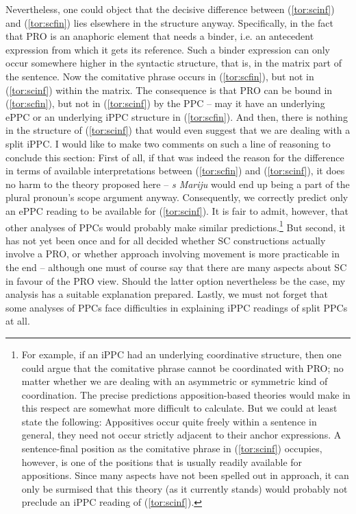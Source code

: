 \documentclass[output=paper,colorlinks,citecolor=brown]{langscibook}
\begin{document}
Nevertheless, one could object that the decisive difference between (\ref{tor:scinf}) and (\ref{tor:scfin}) lies elsewhere in the structure anyway. Specifically, in the fact that PRO is an anaphoric element that needs a binder, i.e. an antecedent expression from which it gets its reference. Such a binder expression can only occur somewhere higher in the syntactic structure, that is, in the matrix part of the sentence. Now the comitative phrase occurs in (\ref{tor:scfin}), but not in (\ref{tor:scinf}) within the matrix. The consequence is that PRO can be bound in (\ref{tor:scfin}), but not in (\ref{tor:scinf}) by the PPC -- may it have an underlying ePPC  or an underlying iPPC structure in (\ref{tor:scfin}). And then, there is nothing in the structure of (\ref{tor:scinf}) that would even suggest that we are dealing with a split iPPC. I would like to make two comments on such a line of reasoning to conclude this section: First of all, if that was indeed the reason for the difference in terms of available interpretations between (\ref{tor:scfin}) and (\ref{tor:scinf}), it does no harm to the theory proposed here -- \textit{s Mariju} would end up being a part of the plural pronoun's scope argument anyway. Consequently, we correctly predict only an ePPC reading to be available for (\ref{tor:scinf}). It is fair to admit, however, that other analyses of PPCs would probably make similar predictions.\footnote{For example, if an iPPC had an underlying coordinative structure, then one could argue that the comitative phrase cannot be coordinated with PRO; no matter whether we are dealing with an asymmetric or symmetric kind of coordination. The precise predictions apposition-based theories would make in this respect are somewhat more difficult to calculate. But we could at least state the following: Appositives occur quite freely within a sentence in general, they need not occur strictly adjacent to their anchor expressions. A sentence-final position as the comitative phrase in (\ref{tor:scinf}) occupies, however, is one of the positions that is usually readily available for appositions. Since many aspects have not been spelled out in  approach, it can only be surmised that this theory (as it currently stands) would probably not preclude an iPPC reading of (\ref{tor:scinf}).} But second, it has not yet been once and for all decided whether SC constructions actually involve a PRO, or whether  approach involving movement is more practicable in the end -- although one must of course say that there are many aspects about SC in favour of the PRO view. Should the latter option nevertheless be the case, my analysis has a suitable explanation prepared. Lastly, we must not forget that some analyses of PPCs face difficulties in explaining iPPC readings of split PPCs at all. 
\end{document}
